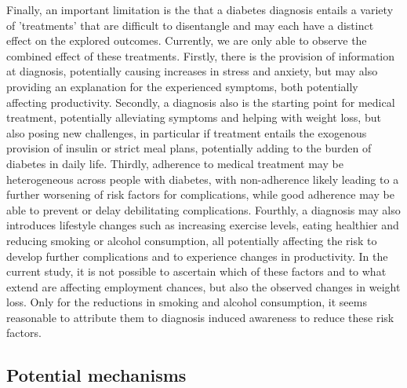 Finally, an important limitation is the that a diabetes diagnosis entails a variety of 'treatments' that are difficult to disentangle and may each have a distinct effect on the explored outcomes. Currently, we are only able to observe the combined effect of these treatments. Firstly, there is the provision of information at diagnosis, potentially causing increases in stress and anxiety, but may also providing an explanation for the experienced symptoms, both potentially affecting productivity. Secondly, a diagnosis also is the starting point for medical treatment, potentially alleviating symptoms and helping with weight loss, but also posing new challenges, in particular if treatment entails the exogenous provision of insulin or strict meal plans, potentially adding to the burden of diabetes in daily life. Thirdly, adherence to medical treatment may be heterogeneous across people with diabetes, with non-adherence likely leading to a further worsening of risk factors for complications, while good adherence may be able to prevent or delay debilitating complications. Fourthly, a diagnosis may also introduces lifestyle changes such as increasing exercise levels, eating healthier and reducing smoking or alcohol consumption, all potentially affecting the risk to develop further complications and to experience changes in productivity. In the current study, it is not possible to ascertain which of these factors and to what extend are affecting employment chances, but also the observed changes in weight loss. Only for the reductions in smoking and alcohol consumption, it seems reasonable to attribute them to diagnosis induced awareness to reduce these risk factors.


\subsection{Potential mechanisms}

